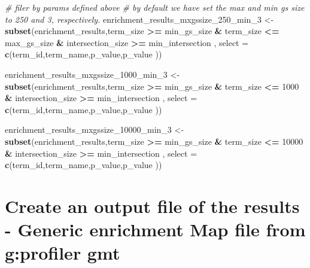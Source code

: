 \documentclass[
]{book}
\newenvironment{Shaded}{\begin{snugshade}}{\end{snugshade}}
\newcommand{\AttributeTok}[1]{\textcolor[rgb]{0.13,0.29,0.53}{#1}}
\newcommand{\CommentTok}[1]{\textcolor[rgb]{0.56,0.35,0.01}{\textit{#1}}}
\newcommand{\DecValTok}[1]{\textcolor[rgb]{0.00,0.00,0.81}{#1}}
\newcommand{\FunctionTok}[1]{\textcolor[rgb]{0.13,0.29,0.53}{\textbf{#1}}}
\newcommand{\NormalTok}[1]{#1}
\newcommand{\OtherTok}[1]{\textcolor[rgb]{0.56,0.35,0.01}{#1}}
\newcommand{\SpecialCharTok}[1]{\textcolor[rgb]{0.81,0.36,0.00}{\textbf{#1}}}
\begin{document}
\begin{Shaded}
\begin{Highlighting}[]
\CommentTok{\# filer by params defined above}
\CommentTok{\# by default we have set the max and min gs size to 250 and 3, respectively.}
\NormalTok{enrichment\_results\_mxgssize\_250\_min\_3 }\OtherTok{\textless{}{-}} 
                        \FunctionTok{subset}\NormalTok{(enrichment\_results,term\_size }\SpecialCharTok{\textgreater{}=}\NormalTok{ min\_gs\_size }\SpecialCharTok{\&} 
\NormalTok{                                   term\_size }\SpecialCharTok{\textless{}=}\NormalTok{ max\_gs\_size }\SpecialCharTok{\&} 
\NormalTok{                                   intersection\_size }\SpecialCharTok{\textgreater{}=}\NormalTok{ min\_intersection , }
                                 \AttributeTok{select =} \FunctionTok{c}\NormalTok{(term\_id,term\_name,p\_value,p\_value ))}

\NormalTok{enrichment\_results\_mxgssize\_1000\_min\_3 }\OtherTok{\textless{}{-}} 
                        \FunctionTok{subset}\NormalTok{(enrichment\_results,term\_size }\SpecialCharTok{\textgreater{}=}\NormalTok{ min\_gs\_size }\SpecialCharTok{\&} 
\NormalTok{                                   term\_size }\SpecialCharTok{\textless{}=} \DecValTok{1000} \SpecialCharTok{\&} 
\NormalTok{                                   intersection\_size }\SpecialCharTok{\textgreater{}=}\NormalTok{ min\_intersection , }
                                 \AttributeTok{select =} \FunctionTok{c}\NormalTok{(term\_id,term\_name,p\_value,p\_value ))}

\NormalTok{enrichment\_results\_mxgssize\_10000\_min\_3 }\OtherTok{\textless{}{-}} 
                        \FunctionTok{subset}\NormalTok{(enrichment\_results,term\_size }\SpecialCharTok{\textgreater{}=}\NormalTok{ min\_gs\_size }\SpecialCharTok{\&} 
\NormalTok{                                   term\_size }\SpecialCharTok{\textless{}=} \DecValTok{10000} \SpecialCharTok{\&} 
\NormalTok{                                   intersection\_size }\SpecialCharTok{\textgreater{}=}\NormalTok{ min\_intersection , }
                                 \AttributeTok{select =} \FunctionTok{c}\NormalTok{(term\_id,term\_name,p\_value,p\_value ))}
\end{Highlighting}
\end{Shaded}

\section{Create an output file of the results - Generic enrichment Map file from g:profiler gmt}\label{create-an-output-file-of-the-results---generic-enrichment-map-file-from-gprofiler-gmt}
\end{document}
